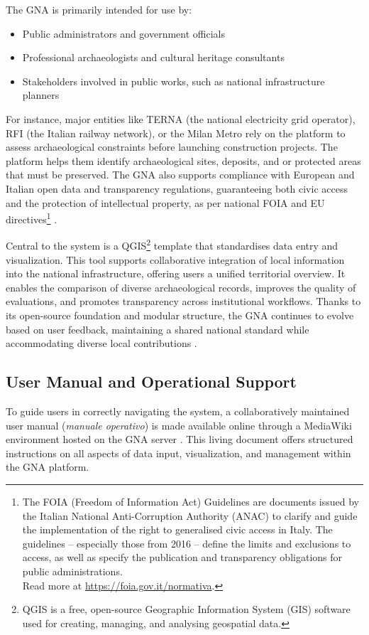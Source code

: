 \begin{spacing}{1.5}
The GNA is primarily intended for use by:
\begin{itemize}
    \item Public administrators and government officials
    \item Professional archaeologists and cultural heritage consultants
    \item Stakeholders involved in public works, such as national infrastructure planners
\end{itemize}

\noindent For instance, major entities like TERNA (the national electricity grid operator), RFI (the Italian railway network), or the Milan Metro rely on the platform to assess archaeological constraints before launching construction projects. The platform helps them identify archaeological sites, deposits, and or protected areas that must be preserved. The GNA also supports compliance with European and Italian open data and transparency regulations, guaranteeing both civic access and the protection of intellectual property, as per national FOIA and EU directives\footnote{The FOIA (Freedom of Information Act) Guidelines are documents issued by the Italian National Anti-Corruption Authority (ANAC) to clarify and guide the implementation of the right to generalised civic access in Italy. The guidelines -- especially those from 2016 -- define the limits and exclusions to access, as well as specify the publication and transparency obligations for public administrations.\\Read more at \url{https://foia.gov.it/normativa}.\nocite{noauthor_normativa_2016}} \citep{falcone_dematerializzazione_2023}.

Central to the system is a QGIS\footnote{QGIS is a free, open-source Geographic Information System (GIS) software used for creating, managing, and analysing geospatial data.} template that standardises data entry and visualization. This tool supports collaborative integration of local information into the national infrastructure, offering users a unified territorial overview. It enables the comparison of diverse archaeological records, improves the quality of evaluations, and promotes transparency across institutional workflows. Thanks to its open-source foundation and modular structure, the GNA continues to evolve based on user feedback, maintaining a shared national standard while accommodating diverse local contributions \citep{calandra_il_2023, boi_il_2023}.

\subsection{User Manual and Operational Support}
To guide users in correctly navigating the system, a collaboratively maintained user manual (\textit{manuale operativo}) is made available online through a MediaWiki environment hosted on the GNA server \citep{gna_wiki_2024}. This living document offers structured instructions on all aspects of data input, visualization, and management within the GNA platform.


\end{spacing}
